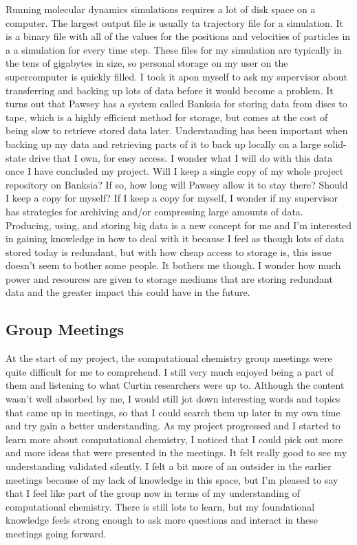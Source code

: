 \documentclass[11pt]{article}
\begin{document}
Running molecular dynamics simulations requires a lot of disk space on a computer. The largest output file is usually ta trajectory file for a simulation. It is a binary file with all of the values for the positions and velocities of particles in a a simulation for every time step. These files for my simulation are typically in the tens of gigabytes in size, so personal storage on my user on the supercomputer is quickly filled. I took it apon myself to ask my supervisor about transferring and backing up lots of data before it would become a problem. It turns out that Pawsey has a system called Banksia for storing data from discs to tape, which is a highly efficient method for storage, but comes at the cost of being slow to retrieve stored data later. Understanding has been important when backing up my data and retrieving parts of it to back up locally on a large solid-state drive that I own, for easy access. I wonder what I will do with this data once I have concluded my project. Will I keep a single copy of my whole project repository on Banksia? If so, how long will Pawsey allow it to stay there? Should I keep a copy for myself? If I keep a copy for myself, I wonder if my supervisor has strategies for archiving and/or compressing large amounts of data. Producing, using, and storing big data is a new concept for me and I'm interested in gaining knowledge in how to deal with it because I feel as though lots of data stored today is redundant, but with how cheap access to storage is, this issue doesn't seem to bother some people. It bothers me though. I wonder how much power and resources are given to storage mediums that are storing redundant data and the greater impact this could have in the future.

\subsection{Group Meetings}

At the start of my project, the computational chemistry group meetings were quite difficult for me to comprehend. I still very much enjoyed being a part of them and listening to what Curtin researchers were up to. Although the content wasn't well absorbed by me, I would still jot down interesting words and topics that came up in meetings, so that I could search them up later in my own time and try gain a better understanding. As my project progressed and I started to learn more about computational chemistry, I noticed that I could pick out more and more ideas that were presented in the meetings. It felt really good to see my understanding validated silently. I felt a bit more of an outsider in the earlier meetings because of my lack of knowledge in this space, but I'm pleased to say that I feel like part of the group now in terms of my understanding of computational chemistry. There is still lots to learn, but my foundational knowledge feels strong enough to ask more questions and interact in these meetings going forward.
\end{document}
